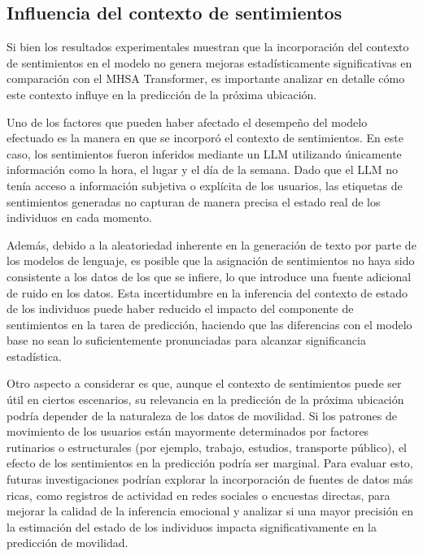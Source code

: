 \subsection{Influencia del contexto de sentimientos}
Si bien los resultados experimentales muestran que la 
incorporación del contexto de sentimientos en el modelo 
no genera mejoras estadísticamente significativas en comparación 
con el MHSA Transformer, es importante analizar en detalle cómo 
este contexto influye en la predicción de la próxima ubicación. 

Uno de los factores que pueden haber afectado
el desempeño del modelo efectuado 
es la manera en que se 
incorporó el contexto de sentimientos. En este caso, 
los sentimientos fueron inferidos mediante un LLM 
utilizando únicamente información como la hora, el lugar y 
el día de la semana. Dado que el LLM no tenía acceso a 
información subjetiva o explícita de los usuarios, 
las etiquetas de sentimientos generadas no  
capturan de manera precisa el estado real de 
los individuos en cada momento.

Además, debido a la aleatoriedad inherente en la 
generación de texto por parte de los modelos de 
lenguaje, es posible que la asignación de sentimientos no 
haya sido consistente a los datos de los que se infiere, 
lo que introduce una fuente 
adicional de ruido en los datos. Esta incertidumbre 
en la inferencia del contexto de estado de los individuos 
puede haber reducido 
el impacto del componente de sentimientos en la tarea de 
predicción, haciendo que las diferencias con el modelo base 
no sean lo suficientemente pronunciadas para alcanzar 
significancia estadística.

Otro aspecto a considerar es que, aunque el contexto de 
sentimientos puede ser útil en ciertos escenarios, su 
relevancia en la predicción de la próxima ubicación podría 
depender de la naturaleza de los datos de movilidad. 
Si los patrones de movimiento de los usuarios están 
mayormente determinados por factores rutinarios o 
estructurales (por ejemplo, trabajo, estudios, 
transporte público), el efecto de los sentimientos en la 
predicción podría ser marginal. Para evaluar esto, futuras 
investigaciones podrían explorar la incorporación de fuentes 
de datos más ricas, como registros de actividad en redes 
sociales o encuestas directas, para mejorar la calidad de 
la inferencia emocional y analizar si una mayor precisión 
en la estimación del estado de los individuos impacta 
significativamente en la predicción de movilidad.

